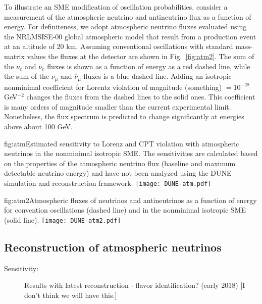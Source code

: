 To illustrate an SME modification of oscillation probabilities,
consider a measurement of the atmospheric neutrino and antineutrino flux
as a function of energy.
For definiteness,
we adopt atmospheric neutrino fluxes 
evaluated using the NRLMSISE-00 global atmospheric model
that result from a production event at an altitude of 20 km.
Assuming conventional oscillations with standard mass-matrix values 
the fluxes at the detector are shown in Fig.\ \ref{fig:atm2}.
The sum of the $\nu_e$ and $\overline\nu_e$ fluxes
is shown as a function of energy as a red dashed line, 
while the sum of the $\nu_\mu$ and $\overline\nu_\mu$ fluxes 
is a blue dashed line. 
Adding an isotropic nonminimal coefficient for Lorentz violation
of magnitude %
(something) $= 10^{-28}$ GeV$^{-2}$
changes the fluxes from the dashed lines to the solid ones.
This coefficient is many orders of magnitude smaller
than the current experimental limit.
Nonetheless,
the flux spectrum is predicted to change significantly 
at energies above about 100 GeV. 

\begin{dunefigure}{fig:atm}{Estimated sensitivity to Lorenz and CPT violation with atmospheric neutrinos in the nonminimal isotropic SME.  The sensitivities are calculated based on the properties of the atmospheric neutrino flux (baseline and maximum detectable neutrino energy) and have not been analyzed using the DUNE simulation and reconstruction framework.}
\texttt{[image: DUNE-atm.pdf]}
\end{dunefigure}

\begin{dunefigure}{fig:atm2}{Atmospheric fluxes of neutrinos and antineutrinos as a function of energy for convention oscillations (dashed line) and in the nonminimal isotropic SME (solid line).}
\texttt{[image: DUNE-atm2.pdf]}
\end{dunefigure}


\subsection{Reconstruction of atmospheric neutrinos}
\label{sec:nonaccel-atm-reco}

\begin{description}
\item[Sensitivity:] Results with latest reconstruction - flavor identification?  (early 2018) [I don't think we will have this.]
\end{description}
